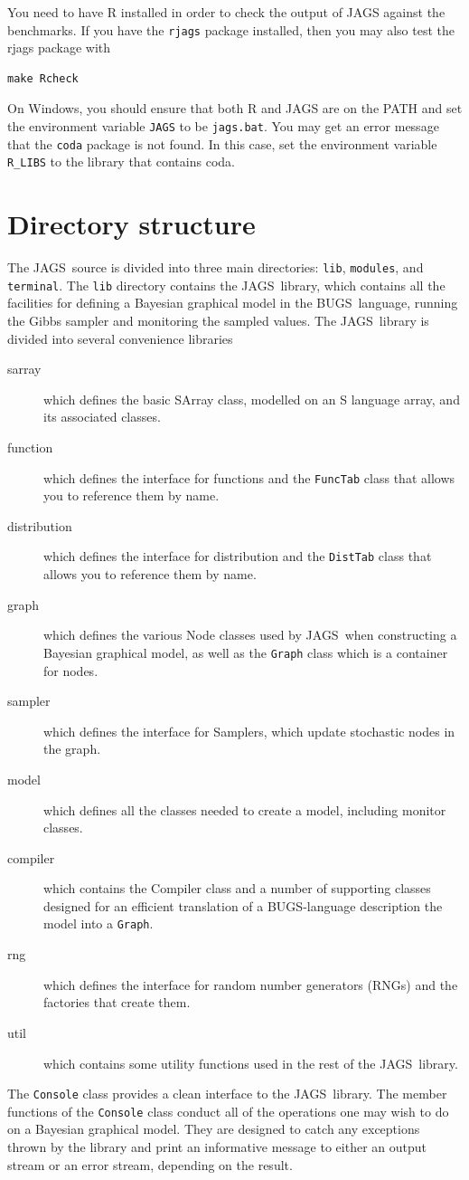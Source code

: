\documentclass[11pt, a4paper, titlepage]{report}
\newcommand{\JAGS}{\textsf{JAGS}}
\newcommand{\BUGS}{\textsf{BUGS}}
\begin{document}
You need to have R installed in order to check the output of JAGS
against the benchmarks.  If you have the \texttt{rjags} package
installed, then you may also test the rjags package with
\begin{verbatim}
make Rcheck
\end{verbatim}

On Windows, you should ensure that both R and JAGS are on the PATH and
set the environment variable \texttt{JAGS} to be \texttt{jags.bat}.
You may get an error message that the \texttt{coda} package is not
found. In this case, set the environment variable \verb+R_LIBS+ to
the library that contains coda.

\chapter{Directory structure}

The \JAGS\ source is divided into three main directories:
\texttt{lib}, \texttt{modules}, and \texttt{terminal}. The
\texttt{lib} directory contains the \JAGS\ library, which contains all
the facilities for defining a Bayesian graphical model in the \BUGS\
language, running the Gibbs sampler and monitoring the sampled
values. The \JAGS\ library is divided into several convenience
libraries
\begin{description}
\item[sarray] which defines the basic SArray class, modelled on an
\textsf{S} language array, and its associated classes.
\item[function] which defines the interface for functions and
the \texttt{FuncTab} class that allows you to reference them by name.
\item[distribution] which defines the interface for distribution and
the \texttt{DistTab} class that allows you to reference them by name.
\item[graph] which defines the various Node classes used by \JAGS\
when constructing a Bayesian graphical model, as well as the \texttt{Graph}
class which is a container for nodes.
\item[sampler] which defines the interface for Samplers, which update
stochastic nodes in the graph.
\item[model] which defines all the classes needed to create a model,
including monitor classes.
\item[compiler] which contains the Compiler class and a number of 
supporting classes designed for an efficient translation of a BUGS-language
description the model into a \texttt{Graph}.
\item[rng] which defines the interface for random number generators (RNGs)
and the factories that create them.
\item[util] which contains some utility functions used in the rest of
the \JAGS\ library.
\end{description}
The \texttt{Console} class provides a clean interface to the \JAGS\
library.  The member functions of the \texttt{Console} class conduct
all of the operations one may wish to do on a Bayesian graphical
model.  They are designed to catch any exceptions thrown by the
library and print an informative message to either an output stream or
an error stream, depending on the result.
\end{document}
